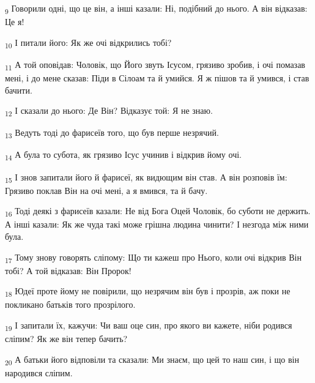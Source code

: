 \begin{tcolorbox}
\textsubscript{9} Говорили одні, що це він, а інші казали: Ні, подібний до нього. А він відказав: Це я!
\end{tcolorbox}
\begin{tcolorbox}
\textsubscript{10} І питали його: Як же очі відкрились тобі?
\end{tcolorbox}
\begin{tcolorbox}
\textsubscript{11} А той оповідав: Чоловік, що Його звуть Ісусом, грязиво зробив, і очі помазав мені, і до мене сказав: Піди в Сілоам та й умийся. Я ж пішов та й умився, і став бачити.
\end{tcolorbox}
\begin{tcolorbox}
\textsubscript{12} І сказали до нього: Де Він? Відказує той: Я не знаю.
\end{tcolorbox}
\begin{tcolorbox}
\textsubscript{13} Ведуть тоді до фарисеїв того, що був перше незрячий.
\end{tcolorbox}
\begin{tcolorbox}
\textsubscript{14} А була то субота, як грязиво Ісус учинив і відкрив йому очі.
\end{tcolorbox}
\begin{tcolorbox}
\textsubscript{15} І знов запитали його й фарисеї, як видющим він став. А він розповів їм: Грязиво поклав Він на очі мені, а я вмився, та й бачу.
\end{tcolorbox}
\begin{tcolorbox}
\textsubscript{16} Тоді деякі з фарисеїв казали: Не від Бога Оцей Чоловік, бо суботи не держить. А інші казали: Як же чуда такі може грішна людина чинити? І незгода між ними була.
\end{tcolorbox}
\begin{tcolorbox}
\textsubscript{17} Тому знову говорять сліпому: Що ти кажеш про Нього, коли очі відкрив Він тобі? А той відказав: Він Пророк!
\end{tcolorbox}
\begin{tcolorbox}
\textsubscript{18} Юдеї проте йому не повірили, що незрячим він був і прозрів, аж поки не покликано батьків того прозрілого.
\end{tcolorbox}
\begin{tcolorbox}
\textsubscript{19} І запитали їх, кажучи: Чи ваш оце син, про якого ви кажете, ніби родився сліпим? Як же він тепер бачить?
\end{tcolorbox}
\begin{tcolorbox}
\textsubscript{20} А батьки його відповіли та сказали: Ми знаєм, що цей то наш син, і що він народився сліпим.
\end{tcolorbox}

